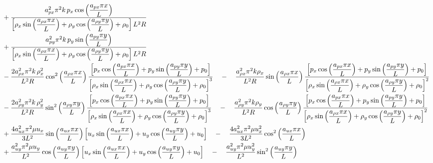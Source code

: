 \documentclass[10pt]{article}
\begin{document}
\begin{landscape}
\begin{equation*}\label{eq:source_e2}
\begin{split}
\displaystyle
& + \dfrac{a_{px}^2 \pi ^2k\,p_x \cos\left(\dfrac{a_{px} \pi x}{L}\right)}{\left[\rho_x \sin\left(\dfrac{a_{\rho x} \pi x}{L}\right) + \rho_y \cos\left(\dfrac{a_{\rho y} \pi y}{L}\right) + \rho_0\right]L^2R}\\
& + \dfrac{a_{py}^2 \pi ^2k\,p_y \sin\left(\dfrac{a_{py} \pi y}{L}\right)}{\left[\rho_x \sin\left(\dfrac{a_{\rho x} \pi x}{L}\right) + \rho_y \cos\left(\dfrac{a_{\rho y} \pi y}{L}\right) + \rho_0\right]L^2R}\\
%
& - \dfrac{2a_{\rho x}^2 \pi ^2 k\,\rho_x^2}{L^2R} \cos^2\left(\dfrac{a_{\rho x} \pi x}{L}\right)\dfrac{\left[p_x \cos\left(\dfrac{a_{px} \pi x}{L}\right) + p_y \sin\left(\dfrac{a_{py} \pi y}{L}\right) + p_0\right]}{\left[\rho_x \sin\left(\dfrac{a_{\rho x} \pi x}{L}\right) + \rho_y \cos\left(\dfrac{a_{\rho y} \pi y}{L}\right) + \rho_0\right]^3}\quad - \quad\dfrac{a_{\rho x}^2 \pi ^2 k \rho_x  }{L^2R} \sin\left(\dfrac{a_{\rho x} \pi x}{L}\right)\dfrac{\left[p_x \cos\left(\dfrac{a_{px} \pi x}{L}\right) + p_y \sin\left(\dfrac{a_{py} \pi y}{L}\right) + p_0\right]}{\left[\rho_x \sin\left(\dfrac{a_{\rho x} \pi x}{L}\right) + \rho_y \cos\left(\dfrac{a_{\rho y} \pi y}{L}\right) + \rho_0\right]^2}\\
%
& - \dfrac{2a_{\rho y}^2 \pi ^2 k\,\rho_y^2}{L^2R} \sin^2\left(\dfrac{a_{\rho y} \pi y}{L}\right)\dfrac{\left[p_x \cos\left(\dfrac{a_{px} \pi x}{L}\right) + p_y \sin\left(\dfrac{a_{py} \pi y}{L}\right) + p_0\right]}{\left[\rho_x \sin\left(\dfrac{a_{\rho x} \pi x}{L}\right) + \rho_y \cos\left(\dfrac{a_{\rho y} \pi y}{L}\right) + \rho_0\right]^3}\quad - \quad\dfrac{a_{\rho y}^2 \pi^2 k \rho_y  }{L^2R} \cos\left(\dfrac{a_{\rho y} \pi y}{L}\right)\dfrac{\left[p_x \cos\left(\dfrac{a_{px} \pi x}{L}\right) + p_y \sin\left(\dfrac{a_{py} \pi y}{L}\right) + p_0\right]}{\left[\rho_x \sin\left(\dfrac{a_{\rho x} \pi x}{L}\right) + \rho_y \cos\left(\dfrac{a_{\rho y} \pi y}{L}\right) + \rho_0\right]^2}\\
&+\dfrac{4a_{ux}^2\pi ^2\mu u_x}{3L^2} \sin\left(\dfrac{a_{ux} \pi x}{L}\right)\left[u_x \sin\left(\dfrac{a_{ux} \pi x}{L}\right) + u_y \cos\left(\dfrac{a_{uy} \pi y}{L}\right) + u_0\right]\quad - \quad\dfrac{4a_{ux}^2 \pi ^2\mu u_x^2}{3L^2} \cos^2\left(\dfrac{a_{ux} \pi x}{L}\right)\\
& + \dfrac{a_{uy}^2\pi ^2\mu u_y}{L^2} \cos\left(\dfrac{a_{uy} \pi y}{L}\right)\left[u_x \sin\left(\dfrac{a_{ux} \pi x}{L}\right) + u_y \cos\left(\dfrac{a_{uy} \pi y}{L}\right) + u_0\right]\quad - \quad\dfrac{a_{uy}^2\pi ^2\mu u_y^2}{L^2} \sin^2\left(\dfrac{a_{uy} \pi y}{L}\right)\\

\end{split}
\end{equation*}
\end{landscape}
\end{document}
